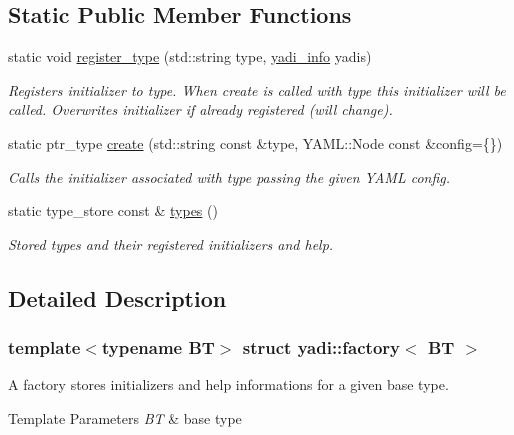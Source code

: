 \subsection*{Static Public Member Functions}
\begin{DoxyCompactItemize}
\item 
static void \hyperlink{structyadi_1_1factory_a512c17ea9ca1bde8dec81c22b08e5278}{register\+\_\+type} (std\+::string type, \hyperlink{structyadi_1_1factory_1_1yadi__info}{yadi\+\_\+info} yadis)
\begin{DoxyCompactList}\small\item\em Registers initializer to type. When create is called with type this initializer will be called. Overwrites initializer if already registered (will change). \end{DoxyCompactList}\item 
static ptr\+\_\+type \hyperlink{structyadi_1_1factory_a600474900d2c6fa5d09935a641298bd5}{create} (std\+::string const \&type, Y\+A\+M\+L\+::\+Node const \&config=\{\})
\begin{DoxyCompactList}\small\item\em Calls the initializer associated with type passing the given Y\+A\+ML config. \end{DoxyCompactList}\item 
static type\+\_\+store const  \& \hyperlink{structyadi_1_1factory_aa167d70b963561d24c8a32f680d7e8c0}{types} ()
\begin{DoxyCompactList}\small\item\em Stored types and their registered initializers and help. \end{DoxyCompactList}\end{DoxyCompactItemize}


\subsection{Detailed Description}
\subsubsection*{template$<$typename BT$>$\newline
struct yadi\+::factory$<$ B\+T $>$}

A factory stores initializers and help informations for a given base type. 


\begin{DoxyTemplParams}{Template Parameters}
{\em BT} & base type \\
\hline
\end{DoxyTemplParams}


